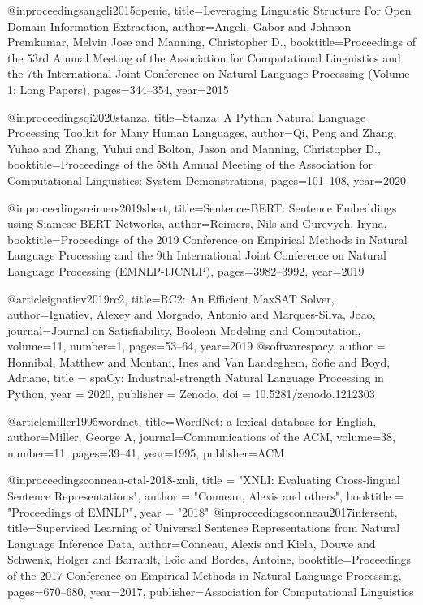
@inproceedings{angeli2015openie,
  title={Leveraging Linguistic Structure For Open Domain Information Extraction},
  author={Angeli, Gabor and Johnson Premkumar, Melvin Jose and Manning, Christopher D.},
  booktitle={Proceedings of the 53rd Annual Meeting of the Association for Computational Linguistics and the 7th International Joint Conference on Natural Language Processing (Volume 1: Long Papers)},
  pages={344--354},
  year={2015}
}

@inproceedings{qi2020stanza,
  title={{Stanza}: A {Python} Natural Language Processing Toolkit for Many Human Languages},
  author={Qi, Peng and Zhang, Yuhao and Zhang, Yuhui and Bolton, Jason and Manning, Christopher D.},
  booktitle={Proceedings of the 58th Annual Meeting of the Association for Computational Linguistics: System Demonstrations},
  pages={101--108},
  year={2020}
}

@inproceedings{reimers2019sbert,
  title={Sentence-{BERT}: Sentence Embeddings using Siamese {BERT}-Networks},
  author={Reimers, Nils and Gurevych, Iryna},
  booktitle={Proceedings of the 2019 Conference on Empirical Methods in Natural Language Processing and the 9th International Joint Conference on Natural Language Processing (EMNLP-IJCNLP)},
  pages={3982--3992},
  year={2019}
}


@article{ignatiev2019rc2,
  title={{RC2}: An Efficient {MaxSAT} Solver},
  author={Ignatiev, Alexey and Morgado, Antonio and Marques-Silva, Joao},
  journal={Journal on Satisfiability, Boolean Modeling and Computation},
  volume={11},
  number={1},
  pages={53--64},
  year={2019}
}
@software{spacy,
  author = {Honnibal, Matthew and Montani, Ines and Van Landeghem, Sofie and Boyd, Adriane},
  title = {{spaCy}: Industrial-strength Natural Language Processing in Python},
  year = 2020,
  publisher = {Zenodo},
  doi = {10.5281/zenodo.1212303}
}

@article{miller1995wordnet,
  title={WordNet: a lexical database for English},
  author={Miller, George A},
  journal={Communications of the ACM},
  volume={38},
  number={11},
  pages={39--41},
  year={1995},
  publisher={ACM}
}

@inproceedings{conneau-etal-2018-xnli,
  title = "XNLI: Evaluating Cross-lingual Sentence Representations",
  author = "Conneau, Alexis and others",
  booktitle = "Proceedings of EMNLP",
  year = "2018"
}
@inproceedings{conneau2017infersent,
  title={Supervised Learning of Universal Sentence Representations from Natural Language Inference Data},
  author={Conneau, Alexis and Kiela, Douwe and Schwenk, Holger and Barrault, Lo{\"\i}c and Bordes, Antoine},
  booktitle={Proceedings of the 2017 Conference on Empirical Methods in Natural Language Processing},
  pages={670--680},
  year={2017},
  publisher={Association for Computational Linguistics}
}
